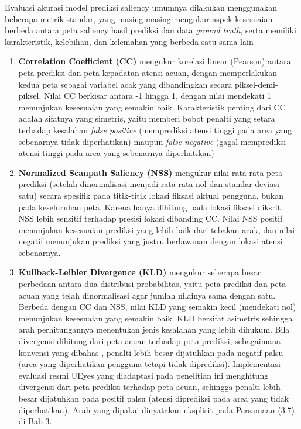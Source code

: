 Evaluasi akurasi model prediksi saliency umumnya dilakukan menggunakan beberapa metrik standar, yang masing-masing mengukur aspek kesesuaian berbeda antara peta saliency hasil prediksi dan data \textit{ground truth}, serta memiliki karakteristik, kelebihan, dan kelemahan yang berbeda satu sama lain \citep{bylinskii2019what}

\begin{enumerate}
    \item \textbf{Correlation Coefficient (CC)} mengukur korelasi linear (Pearson) antara peta prediksi dan peta kepadatan atensi acuan, dengan memperlakukan kedua peta sebagai variabel acak yang dibandingkan secara piksel-demi-piksel. Nilai CC berkisar antara -1 hingga 1, dengan nilai mendekati 1 menunjukan kesesuaian yang semakin baik. Karakteristik penting dari CC adalah sifatnya yang simetris, yaitu memberi bobot penalti yang setara terhadap kesalahan \textit{false positive} (memprediksi atensi tinggi pada area yang sebenarnya tidak diperhatikan) maupun \textit{false negative} (gagal memprediksi atensi tinggi pada area yang sebenarnya diperhatikan)

    \item \textbf{Normalized Scanpath Saliency (NSS)} mengukur nilai rata-rata peta prediksi (setelah dinormalisasi menjadi rata-rata nol dan standar deviasi satu) secara spesifik pada titik-titik lokasi fiksasi aktual pengguna, bukan pada keseluruhan peta. Karena hanya dihitung pada lokasi fiksasi diksrit, NSS lebih sensitif terhadap presisi lokasi dibanding CC. Nilai NSS positif menunjukan kesesuaian prediksi yang lebih baik dari tebakan acak, dan nilai negatif menunjukan prediksi yang justru berlawanan dengan lokasi atensi sebenarnya.

    \item \textbf{Kullback-Leibler Divergence (KLD)} mengukur seberapa besar perbedaan antara dua distribusi probabilitas, yaitu peta prediksi dan peta acuan yang telah dinormalisasi agar jumlah nilainya sama dengan satu. Berbeda dengan CC dan NSS, nilai KLD yang semakin kecil (mendekati nol) menunjukan kesesuaian yang semakin baik. KLD bersifat asimetris sehingga arah perhitungannya menentukan jenis kesalahan yang lebih dihukum. Bila divergensi dihitung dari peta acuan terhadap peta prediksi, sebagaimana konvensi yang dibahas \citet{bylinskii2019what}, penalti lebih besar dijatuhkan pada negatif palsu (area yang diperhatikan pengguna tetapi tidak diprediksi). Implementasi evaluasi resmi UEyes yang diadaptasi pada penelitian ini menghitung divergensi dari peta prediksi terhadap peta acuan, sehingga penalti lebih besar dijatuhkan pada positif palsu (atensi diprediksi pada area yang tidak diperhatikan). Arah yang dipakai dinyatakan eksplisit pada Persamaan (3.7) di Bab 3.


\end{enumerate}
